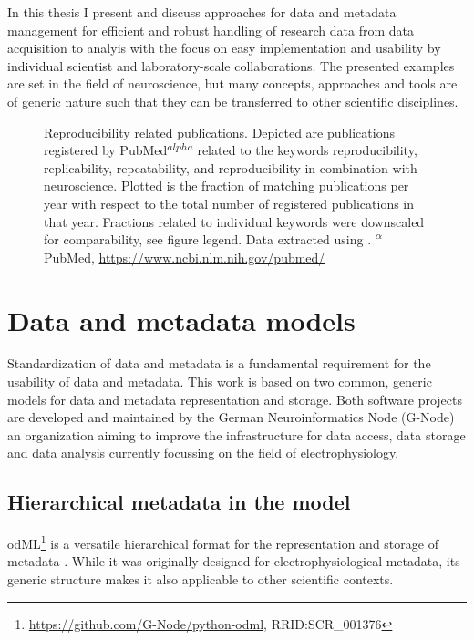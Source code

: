 In this thesis I present and discuss approaches for data and metadata management for efficient and robust handling of research data from data acquisition to analyis with the focus on easy implementation and usability by individual scientist and laboratory-scale collaborations. The presented examples are set in the field of neuroscience, but many concepts, approaches and tools are of generic nature such that they can be transferred to other scientific disciplines. 


\begin{figure}
 \centering
 
 \caption[Reproducibility related publications]{Reproducibility related publications. Depicted  are publications registered by PubMed\textsuperscript{$alpha$} related to the keywords reproducibility, replicability, repeatability, and reproducibility in combination with neuroscience. Plotted is the fraction of matching publications per year with respect to the total number of registered publications in that year. Fractions related to individual keywords were downscaled for comparability, see figure legend. Data extracted using \citet{Corlan_2004}. \small\textsuperscript{$\alpha$} PubMed, \url{https://www.ncbi.nlm.nih.gov/pubmed/}}
 \label{fig:intro_reproducibility}
\end{figure}

\section{Data and metadata models}
Standardization of data and metadata is a fundamental requirement for the usability of data and metadata. This work is based on two common, generic models for data and metadata representation and storage. Both software projects are developed and maintained by the German Neuroinformatics Node (G-Node) an organization aiming to improve the infrastructure for data access, data storage and data analysis currently focussing on the field of electrophysiology.

\subsection{Hierarchical metadata in the  model}
\label{sec:odml}

odML\footnote{\url{https://github.com/G-Node/python-odml}, RRID:SCR\_001376} is a versatile hierarchical format for the representation and storage of metadata \citep{Grewe_2011}. While it was originally designed for electrophysiological metadata, its generic structure makes it also applicable to other scientific contexts.\\

